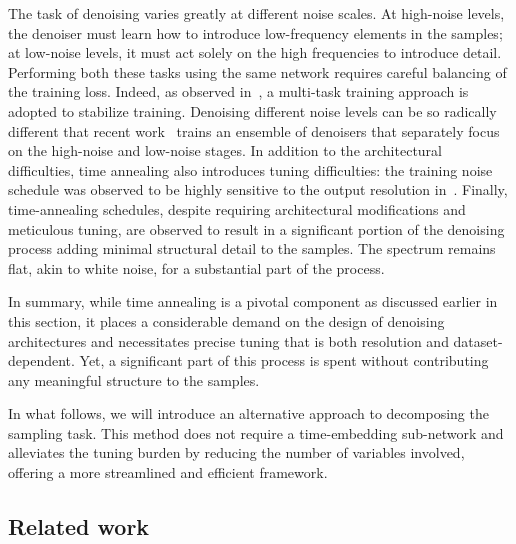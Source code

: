 The task of denoising varies greatly at different noise scales. At high-noise levels, the denoiser must learn how to introduce low-frequency elements in the samples; at low-noise levels, it must act solely on the high frequencies to introduce detail. Performing both these tasks using the same network requires careful balancing of the training loss. Indeed, as observed in~\cite{karras_analyzing_2024}, a multi-task training approach is adopted to stabilize training. Denoising different noise levels can be so radically different that recent work~\cite{balaji_ediff-i_2022} trains an ensemble of denoisers that separately focus on the high-noise and low-noise stages. In addition to the architectural difficulties, time annealing also introduces tuning difficulties: the training noise schedule was observed to be highly sensitive to the output resolution in~\cite{chen_importance_2023}. 
Finally, time-annealing schedules, despite requiring architectural modifications and meticulous tuning, are observed to result in a significant portion of the denoising process adding minimal structural detail to the samples. The spectrum remains flat, akin to white noise, for a substantial part of the process.

In summary, while time annealing is a pivotal component as discussed earlier in this section, it places a considerable demand on the design of denoising architectures and necessitates precise tuning that is both resolution and dataset-dependent. Yet, a significant part of this process is spent without contributing any meaningful structure to the samples. 

In what follows, we will introduce an alternative approach to decomposing the sampling task. This method does not require a time-embedding sub-network and alleviates the tuning burden by reducing the number of variables involved, offering a more streamlined and efficient framework.

\subsection{Related work}

